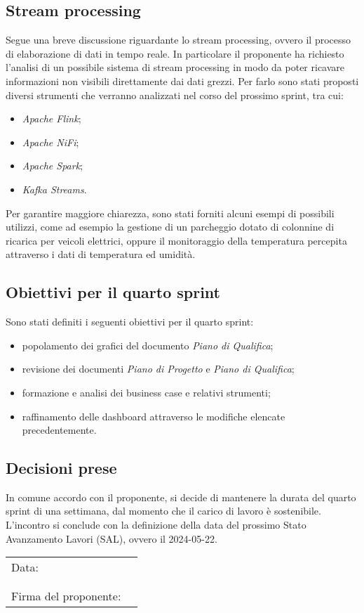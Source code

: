 \documentclass[italian,12pt]{article}
\begin{document}
\newpage
\subsection{Stream processing}
Segue una breve discussione riguardante lo stream processing, ovvero il processo di elaborazione di dati in tempo reale. In particolare il proponente
ha richiesto l'analisi di un possibile sistema di stream processing in modo da poter ricavare informazioni non visibili direttamente dai dati grezzi.
Per farlo sono stati proposti diversi strumenti che verranno analizzati nel corso del prossimo sprint, tra cui:
\begin{itemize}
	\item \textit{Apache Flink};
	\item \textit{Apache NiFi};
	\item \textit{Apache Spark};
	\item \textit{Kafka Streams}.
\end{itemize}
Per garantire maggiore chiarezza, sono stati forniti alcuni esempi di possibili utilizzi, come ad esempio la gestione di un parcheggio dotato di
colonnine di ricarica per veicoli elettrici, oppure il monitoraggio della temperatura percepita attraverso i dati di temperatura ed umidità.

\subsection{Obiettivi per il quarto sprint}
Sono stati definiti i seguenti obiettivi per il quarto sprint:
\begin{itemize}
	\item popolamento dei grafici del documento \textit{Piano di Qualifica};
	\item revisione dei documenti \textit{Piano di Progetto} e \textit{Piano di Qualifica};
	\item formazione e analisi dei business case e relativi strumenti;
	\item raffinamento delle dashboard attraverso le modifiche elencate precedentemente.
\end{itemize}

\subsection{Decisioni prese}
In comune accordo con il proponente, si decide di mantenere la durata del quarto sprint di una settimana,
dal momento che il carico di lavoro è sostenibile.
L'incontro si conclude con la definizione della data del prossimo Stato Avanzamento Lavori (SAL),
ovvero il 2024-05-22.

\newpage
\begin{table}[b]
	\begin{tabular}{@{}p{5cm}p{10cm}@{}}
		Data:  & \hrulefill \\
		       &            \\
		       &            \\
		Firma del proponente: & \hrulefill \\
	\end{tabular}
\end{table}
\end{document}
